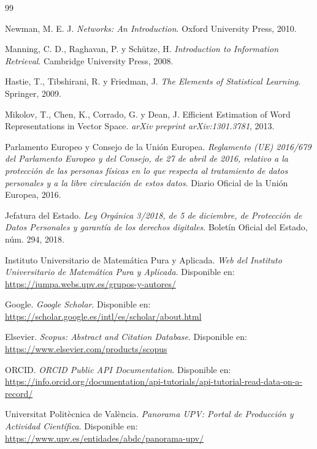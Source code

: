 \documentclass[11pt,spanish,listoffigures,listoftables]{tfgetsinf}
\begin{document}
\begin{thebibliography}{99}

Newman, M. E. J.
\newblock \textit{Networks: An Introduction}.
\newblock Oxford University Press, 2010.

Manning, C. D., Raghavan, P. y Schütze, H.
\newblock \textit{Introduction to Information Retrieval}.
\newblock Cambridge University Press, 2008.

Hastie, T., Tibshirani, R. y Friedman, J.
\newblock \textit{The Elements of Statistical Learning}.
\newblock Springer, 2009.

Mikolov, T., Chen, K., Corrado, G. y Dean, J.
\newblock Efficient Estimation of Word Representations in Vector Space.
\newblock \textit{arXiv preprint arXiv:1301.3781}, 2013.

Parlamento Europeo y Consejo de la Unión Europea.
\newblock \textit{Reglamento (UE) 2016/679 del Parlamento Europeo y del Consejo, de 27 de abril de 2016, relativo a la protección de las personas físicas en lo que respecta al tratamiento de datos personales y a la libre circulación de estos datos}.
\newblock Diario Oficial de la Unión Europea, 2016.

Jefatura del Estado.
\newblock \textit{Ley Orgánica 3/2018, de 5 de diciembre, de Protección de Datos Personales y garantía de los derechos digitales}.
\newblock Boletín Oficial del Estado, núm. 294, 2018.

Instituto Universitario de Matemática Pura y Aplicada.
\newblock \textit{Web del Instituto Universitario de Matemática Pura y Aplicada}.
\newblock Disponible en: \url{https://iumpa.webs.upv.es/grupos-y-autores/}

Google.
\newblock \textit{Google Scholar}.
\newblock Disponible en: \url{https://scholar.google.es/intl/es/scholar/about.html}

Elsevier.
\newblock \textit{Scopus: Abstract and Citation Database}.
\newblock Disponible en: \url{https://www.elsevier.com/products/scopus}

ORCID.
\newblock \textit{ORCID Public API Documentation}.
\newblock Disponible en: \url{https://info.orcid.org/documentation/api-tutorials/api-tutorial-read-data-on-a-record/}

Universitat Politècnica de València.
\newblock \textit{Panorama UPV: Portal de Producción y Actividad Científica}.
\newblock Disponible en: \url{https://www.upv.es/entidades/abdc/panorama-upv/}


\end{thebibliography}
\end{document}
